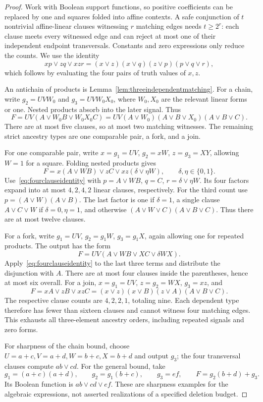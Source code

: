 \documentclass[11pt]{article}
\theoremstyle{definition}
\theoremstyle{remark}
\begin{document}
\begin{proof}
Work with Boolean support functions, so positive coefficients can be replaced by one and squares folded into affine contexts. A safe conjunction of $t$ nontrivial affine-linear clauses witnessing $r$ matching edges needs $t\ge2^r$: each clause meets every witnessed edge and can reject at most one of their independent endpoint transversals. Constants and zero expressions only reduce the counts. We use the identity
\begin{equation}\label{eq:fourclauseidentity}
 xp\vee zq\vee xzr=(x\vee z)(x\vee q)(z\vee p)(p\vee q\vee r),
\end{equation}
which follows by evaluating the four pairs of truth values of $x,z$.

An antichain of products is Lemma~\ref{lem:threeindependentmatching}. For a chain, write $g_2=UVW_0$ and $g_3=UVW_0X_0$, where $W_0,X_0$ are the relevant linear forms or one. Nested products absorb into the later signal. Thus
\[
 F=UV(A\vee W_0B\vee W_0X_0C)
   =UV(A\vee W_0)(A\vee B\vee X_0)(A\vee B\vee C).
\]
There are at most five clauses, so at most two matching witnesses. The remaining strict ancestry types are one comparable pair, a fork, and a join.

For one comparable pair, write $x=g_1=UV$, $g_2=xW$, $z=g_3=XY$, allowing $W=1$ for a square. Folding nested products gives
\[
 F=x(A\vee WB)\vee zC\vee xz(\delta\vee\eta W),
 \qquad \delta,\eta\in\{0,1\}.
\]
Use~\eqref{eq:fourclauseidentity} with $p=A\vee WB$, $q=C$, $r=\delta\vee\eta W$. Its four factors expand into at most $4,2,4,2$ linear clauses, respectively. For the third count use $p=(A\vee W)(A\vee B)$. The last factor is one if $\delta=1$, a single clause $A\vee C\vee W$ if $\delta=0,\eta=1$, and otherwise $(A\vee W\vee C)(A\vee B\vee C)$. Thus there are at most twelve clauses.

For a fork, write $g_1=UV$, $g_2=g_1W$, $g_3=g_1X$, again allowing one for repeated products. The output has the form
\[
 F=UV(A\vee WB\vee XC\vee\delta WX).
\]
Apply~\eqref{eq:fourclauseidentity} to the last three terms and distribute the disjunction with $A$. There are at most four clauses inside the parentheses, hence at most six overall. For a join, $x=g_1=UV$, $z=g_2=WX$, $g_3=xz$, and
\[
 F=xA\vee zB\vee xzC=(x\vee z)(x\vee B)(z\vee A)(A\vee B\vee C).
\]
The respective clause counts are $4,2,2,1$, totaling nine. Each dependent type therefore has fewer than sixteen clauses and cannot witness four matching edges. This exhausts all three-element ancestry orders, including repeated signals and zero forms.

For sharpness of the chain bound, choose $U=a+c,V=a+d,W=b+c,X=b+d$ and output $g_3$; the four transversal clauses compute $ab\vee cd$. For the general bound, take
\[
 g_1=(a+c)(a+d),\qquad g_2=g_1(b+c),\qquad g_3=ef,
 \qquad F=g_2(b+d)+g_3.
\]
Its Boolean function is $ab\vee cd\vee ef$. These are sharpness examples for the algebraic expressions, not asserted realizations of a specified deletion budget.
\end{proof}
\end{document}
